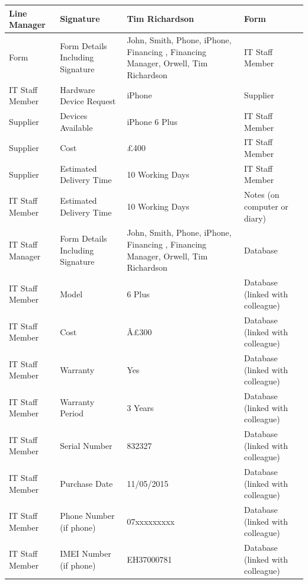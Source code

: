 \begin{longtable}{|p{3cm}|p{3cm}|p{3cm}|p{3cm}|}
Line Manager                          & Signature                          & Tim Richardson                                     & Form                                      \\ \hline
Form                                  & Form Details Including Signature   & John, Smith, Phone, iPhone, Financing , Financing Manager, Orwell, Tim Richardson & IT Staff Member                           \\ \hline
IT Staff Member 	&Hardware Device Request & iPhone & Supplier 												\\ \hline
Supplier & Devices Available & iPhone 6 Plus & IT Staff Member \\ \hline
Supplier & Cost & £400 &IT Staff Member \\ \hline
Supplier & Estimated Delivery Time & 10 Working Days & IT Staff Member \\ \hline
IT Staff Member & Estimated Delivery Time & 10 Working Days & Notes (on computer or diary) \\ \hline
IT Staff Manager                      & Form Details Including Signature   & John, Smith, Phone, iPhone, Financing , Financing Manager, Orwell, Tim Richardson & Database                                  \\ \hline
IT Staff Member                             & Model                              & 6 Plus                                             & Database (linked with colleague)                                      \\ \hline
IT Staff Member                       & Cost                              & Â£300                                               & Database (linked with colleague)          \\ \hline
IT Staff Member                       & Warranty                           & Yes                                        & Database (linked with colleague)          \\ \hline
IT Staff Member                       & Warranty Period                           & 3 Years                                            & Database (linked with colleague)          \\ \hline
IT Staff Member                       & Serial Number                      & 832327                                             & Database (linked with colleague)          \\ \hline
IT Staff Member                       & Purchase Date                      & 11/05/2015                                         & Database (linked with colleague)          \\ \hline
IT Staff Member                       & Phone Number (if phone)            & 07xxxxxxxxx                                        & Database (linked with colleague)          \\ \hline
IT Staff Member		&IMEI Number (if phone)            & EH37000781                                      & Database (linked with colleague)          \\ \hline	
\end{longtable}
\

